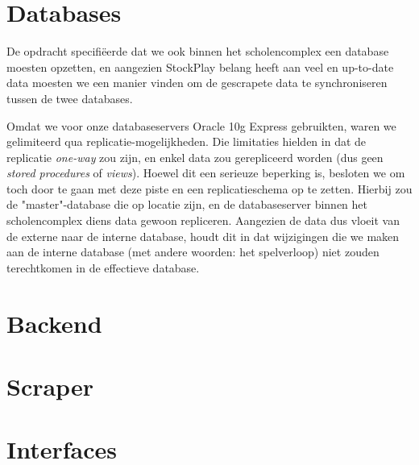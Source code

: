 %
%

\chapter{Databases}

De opdracht specifi\"eerde dat we ook binnen het scholencomplex een database moesten opzetten, en aangezien StockPlay belang heeft aan veel en up-to-date data moesten we een manier vinden om de gescrapete data te synchroniseren tussen de twee databases.

Omdat we voor onze databaseservers Oracle 10g Express gebruikten, waren we gelimiteerd qua replicatie-mogelijkheden. Die limitaties hielden in dat de replicatie \emph{one-way} zou zijn, en enkel data zou gerepliceerd worden (dus geen \emph{stored procedures} of \emph{views}). Hoewel dit een serieuze beperking is, besloten we om toch door te gaan met deze piste en een replicatieschema op te zetten. Hierbij zou de "master"-database die op locatie zijn, en de databaseserver binnen het scholencomplex diens data gewoon repliceren. Aangezien de data dus vloeit van de externe naar de interne database, houdt dit in dat wijzigingen die we maken aan de interne database (met andere woorden: het spelverloop) niet zouden terechtkomen in de effectieve database.


%
%

\chapter{Backend}



%
%

\chapter{Scraper}


%
%

\chapter{Interfaces}
